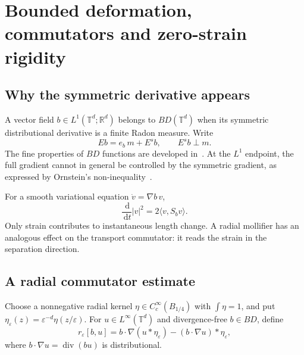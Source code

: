 \documentclass[review,12pt,times,a4paper,nopreprintline]{elsarticle}
\theoremstyle{plain}
\theoremstyle{definition}
\theoremstyle{remark}
\newcommand{\T}{\mathbb T}
\newcommand{\R}{\mathbb R}
\newcommand{\dd}{\,\mathrm d}
\newcommand{\diver}{\operatorname{div}}
\numberwithin{equation}{section}
\begin{document}
\section{Bounded deformation, commutators and zero-strain rigidity}\label{sec:BD}
\subsection{Why the symmetric derivative appears}
A vector field $b\in L^1(\T^d;\R^d)$ belongs to $BD(\T^d)$ when its symmetric distributional derivative is a finite Radon measure. Write
\begin{equation}\label{eq:BDsplit}
 Eb=e_b\,m+E^sb,\qquad E^sb\perp m.
\end{equation}
The fine properties of $BD$ functions are developed in~\cite{ACDM}. At the $L^1$ endpoint, the full gradient cannot in general be controlled by the symmetric gradient, as expressed by Ornstein's non-inequality~\cite{Ornstein}.

For a smooth variational equation $\dot v=\nabla b\,v$,
\[
 \frac{\dd}{\dd t}|v|^2=2\langle v,S_bv\rangle.
\]
Only strain contributes to instantaneous length change. A radial mollifier has an analogous effect on the transport commutator: it reads the strain in the separation direction.

\subsection{A radial commutator estimate}
Choose a nonnegative radial kernel $\eta\in C_c^\infty(B_{1/4})$ with $\int\eta=1$, and put $\eta_\varepsilon(z)=\varepsilon^{-d}\eta(z/\varepsilon)$. For $u\in L^\infty(\T^d)$ and divergence-free $b\in BD$, define
\begin{equation}\label{eq:commutator}
 r_\varepsilon[b,u]
 =b\cdot\nabla(u*\eta_\varepsilon)-(b\cdot\nabla u)*\eta_\varepsilon,
\end{equation}
where $b\cdot\nabla u=\diver(bu)$ is distributional.
\end{document}
